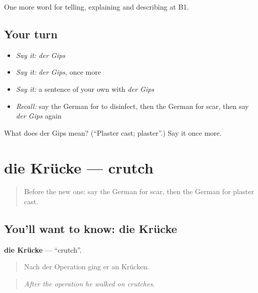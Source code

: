 \begin{grammarlens}[title={What you've built}]
One more word for telling, explaining and describing at B1.
\end{grammarlens}

\subsection*{Your turn}
\begin{itemize}
\raggedright
  \item \emph{Say it:} \emph{der Gips}
  \item \emph{Say it:} \emph{der Gips}, once more
  \item \emph{Say it:} a sentence of your own with \emph{der Gips}
  \item \emph{Recall:} say the German for to disinfect, then the German for scar, then say \emph{der Gips} again
\end{itemize}

\begin{tcolorbox}[breakable,colback=teal!4,colframe=teal!35!black,title={Before you move on}]
What does der Gips mean? (\textquotedblleft{}Plaster cast; plaster\textquotedblright{}.) Say it once more.
\end{tcolorbox}
\section[die Krücke]{die Krücke — crutch}

\label{lesson:GE-C483-kruecke}



\begin{quote}
Before the new one: say the German for scar, then the German for plaster cast.
\end{quote}

\subsection*{You'll want to know: die Krücke}
\textbf{die Krücke} — \textquotedblleft{}crutch\textquotedblright{}.

\begin{quote}
Nach der Operation ging er an Krücken.
\end{quote}

\begin{quote}
\emph{After the operation he walked on crutches.}
\end{quote}

